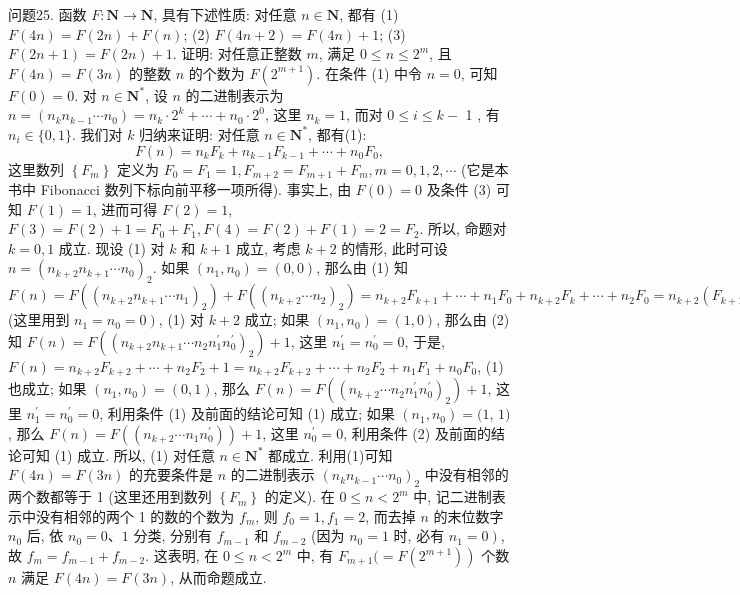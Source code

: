 问题25. 函数 $F: \mathbf{N} \rightarrow \mathbf{N}$, 具有下述性质: 对任意 $n \in \mathbf{N}$, 都有
(1) $F(4 n)=F(2 n)+F(n)$;
(2) $F(4 n+2)=F(4 n)+1$;
(3) $F(2 n+1)=F(2 n)+1$.
证明: 对任意正整数 $m$, 满足 $0 \leqslant n \leqslant 2^m$, 且 $F(4 n)=F(3 n)$ 的整数 $n$ 的个数为 $F\left(2^{m+1}\right)$.
在条件 (1) 中令 $n=0$, 可知 $F(0)=0$. 对 $n \in \mathbf{N}^*$, 设 $n$ 的二进制表示为 $n=\left(n_k n_{k-1} \cdots n_0\right)=n_k \cdot 2^k+\cdots+n_0 \cdot 2^0$, 这里 $n_k=1$, 而对 $0 \leqslant i \leqslant k-$ 1 , 有 $n_i \in\{0,1\}$.
我们对 $k$ 归纳来证明: 对任意 $n \in \mathbf{N}^*$, 都有(1):
$$
F(n)=n_k F_k+n_{k-1} F_{k-1}+\cdots+n_0 F_0,
$$
这里数列 $\left\{F_m\right\}$ 定义为 $F_0=F_1=1, F_{m+2}=F_{m+1}+F_m, m=0,1,2, \cdots$ (它是本书中 Fibonacci 数列下标向前平移一项所得).
事实上, 由 $F(0)=0$ 及条件 (3) 可知 $F(1)=1$, 进而可得 $F(2)=1$, $F(3)=F(2)+1=F_0+F_1, F(4)=F(2)+F(1)=2=F_2$. 所以, 命题对 $k=0,1$ 成立.
现设 (1) 对 $k$ 和 $k+1$ 成立, 考虑 $k+2$ 的情形, 此时可设 $n= \left(n_{k+2} n_{k+1} \cdots n_0\right)_2$. 如果 $\left(n_1, n_0\right)=(0,0)$, 那么由 (1) 知 $F(n)= F\left(\left(n_{k+2} n_{k+1} \cdots n_1\right)_2\right)+F\left(\left(n_{k+2} \cdots n_2\right)_2\right)=n_{k+2} F_{k+1}+\cdots+n_1 F_0+n_{k+2} F_k+\cdots+ n_2 F_0=n_{k+2}\left(F_{k+1}+F_k\right)+\cdots+n_2\left(F_1+F_0\right)+n_1 F_0=n_{k+2} F_{k+2}+\cdots+n_2 F_2+ n_1 F_1+n_0 F_0$ (这里用到 $\left.n_1=n_0=0\right)$, (1) 对 $k+2$ 成立; 如果 $\left(n_1, n_0\right)=(1,0)$, 那么由 (2) 知 $F(n)=F\left(\left(n_{k+2} n_{k+1} \cdots n_2 n_1^{\prime} n_0^{\prime}\right)_2\right)+1$, 这里 $n_1^{\prime}=n_0^{\prime}=0$, 于是, $F(n)=n_{k+2} F_{k+2}+\cdots+n_2 F_2+1=n_{k+2} F_{k+2}+\cdots+n_2 F_2+n_1 F_1+n_0 F_0$, (1) 也成立; 如果 $\left(n_1, n_0\right)=(0,1)$, 那么 $F(n)=F\left(\left(n_{k+2} \cdots n_2 n_1^{\prime} n_0^{\prime}\right)_2\right)+1$, 这里 $n_1^{\prime}=n_0^{\prime}=0$, 利用条件 (1) 及前面的结论可知 (1) 成立; 如果 $\left(n_1, n_0\right)=(1$, $1)$, 那么 $F(n)=F\left(\left(n_{k+2} \cdots n_1 n_0^{\prime}\right)\right)+1$, 这里 $n_0^{\prime}=0$, 利用条件 (2) 及前面的结论可知 (1) 成立.
所以, (1) 对任意 $n \in \mathbf{N}^*$ 都成立.
利用(1)可知 $F(4 n)=F(3 n)$ 的充要条件是 $n$ 的二进制表示 $\left(n_k n_{k-1} \cdots n_0\right)_2$ 中没有相邻的两个数都等于 1 (这里还用到数列 $\left\{F_m\right\}$ 的定义). 在 $0 \leqslant n<2^m$ 中, 记二进制表示中没有相邻的两个 1 的数的个数为 $f_m$, 则 $f_0=1, f_1=2$, 而去掉 $n$ 的末位数字 $n_0$ 后, 依 $n_0=0 、 1$ 分类, 分别有 $f_{m-1}$ 和 $f_{m-2}$ (因为 $n_0=1$ 时, 必有 $\left.n_1=0\right)$, 故 $f_m=f_{m-1}+f_{m-2}$. 这表明, 在 $0 \leqslant n<2^m$ 中, 有 $F_{m+1}(= \left.F\left(2^{m+1}\right)\right)$ 个数 $n$ 满足 $F(4 n)=F(3 n)$, 从而命题成立.



